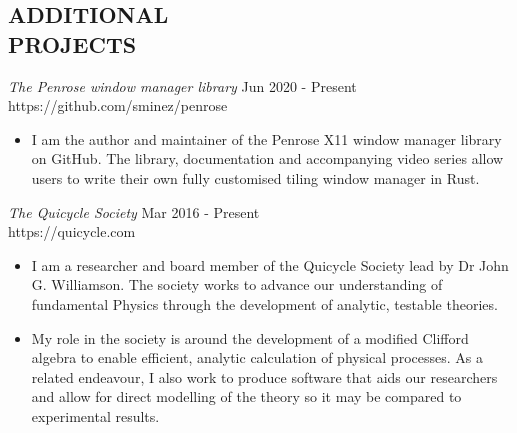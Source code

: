 \documentclass[margin]{res}
\begin{document}
\begin{resume}
\section{ADDITIONAL \\ PROJECTS}             
{\sl The Penrose window manager library} \hfill Jun 2020 - Present \\
https://github.com/sminez/penrose
\begin{itemize}  \itemsep -2pt %
  \item I am the author and maintainer of the Penrose X11 window
        manager library on GitHub. The library, documentation and accompanying
        video series allow users to write their own fully customised tiling
        window manager in Rust.
\end{itemize}

{\sl The Quicycle Society} \hfill Mar 2016 - Present \\
https://quicycle.com
\begin{itemize}  \itemsep -2pt %
  \item I am a researcher and board member of the Quicycle Society lead by
        Dr John G. Williamson. The society works to advance our understanding
        of fundamental Physics through the development of analytic, testable
        theories.
  \item My role in the society is around the development of a modified Clifford
        algebra to enable efficient, analytic calculation of physical processes.
        As a related endeavour, I also work to produce software that aids our
        researchers and allow for direct modelling of the theory so it may be
        compared to experimental results.
\end{itemize}

\end{resume}
\end{document}

